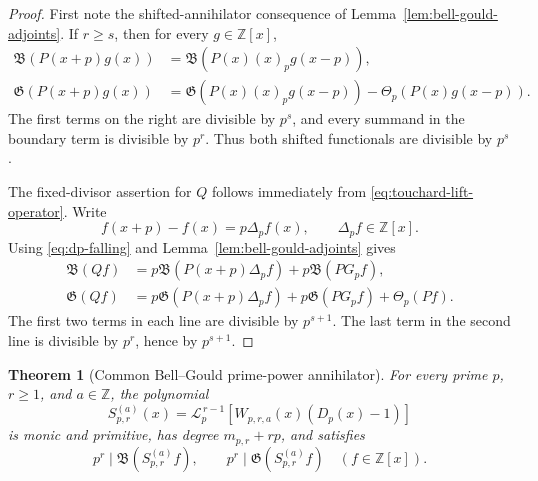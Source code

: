 \documentclass[11pt]{article}
\newtheorem{theorem}{Theorem}[section]
\theoremstyle{definition}
\theoremstyle{remark}
\newcommand{\Z}{\mathbb Z}
\begin{document}
\begin{proof}
First note the shifted-annihilator consequence of
Lemma~\ref{lem:bell-gould-adjoints}.  If \(r\geq s\), then for every
\(g\in\Z[x]\),
\begin{align*}
 \mathfrak B(P(x+p)g(x))
 &=\mathfrak B(P(x)(x)_pg(x-p)),\\
 \mathfrak G(P(x+p)g(x))
 &=\mathfrak G(P(x)(x)_pg(x-p))
   -\Theta_p(P(x)g(x-p)).
\end{align*}
The first terms on the right are divisible by \(p^s\), and every summand in
the boundary term is divisible by \(p^r\).  Thus both shifted functionals
are divisible by \(p^s\).

The fixed-divisor assertion for \(Q\) follows immediately from
\eqref{eq:touchard-lift-operator}.  Write
\[
 f(x+p)-f(x)=p\Delta_pf(x),
 \qquad \Delta_pf\in\Z[x].
\]
Using \eqref{eq:dp-falling} and
Lemma~\ref{lem:bell-gould-adjoints} gives
\begin{align*}
 \mathfrak B(Qf)
 &=p\mathfrak B(P(x+p)\Delta_pf)
   +p\mathfrak B(PG_pf),\\
 \mathfrak G(Qf)
 &=p\mathfrak G(P(x+p)\Delta_pf)
   +p\mathfrak G(PG_pf)+\Theta_p(Pf).
\end{align*}
The first two terms in each line are divisible by \(p^{s+1}\).  The last
term in the second line is divisible by \(p^r\), hence by \(p^{s+1}\).
\end{proof}

\begin{theorem}[Common Bell--Gould prime-power annihilator]
\label{thm:bell-gould-prime-power}
For every prime \(p\), \(r\geq1\), and \(a\in\Z\), the polynomial
\begin{equation}\label{eq:prime-power-annihilator}
 S_{p,r}^{(a)}(x)=
 \mathcal L_p^{\,r-1}
 \left[W_{p,r,a}(x)(D_p(x)-1)\right]
\end{equation}
is monic and primitive, has degree \(m_{p,r}+rp\), and satisfies
\begin{equation}\label{eq:prime-power-universal}
 p^r\mid\mathfrak B(S_{p,r}^{(a)}f),
 \qquad
 p^r\mid\mathfrak G(S_{p,r}^{(a)}f)
 \quad(f\in\Z[x]).
\end{equation}
\end{theorem}
\end{document}
